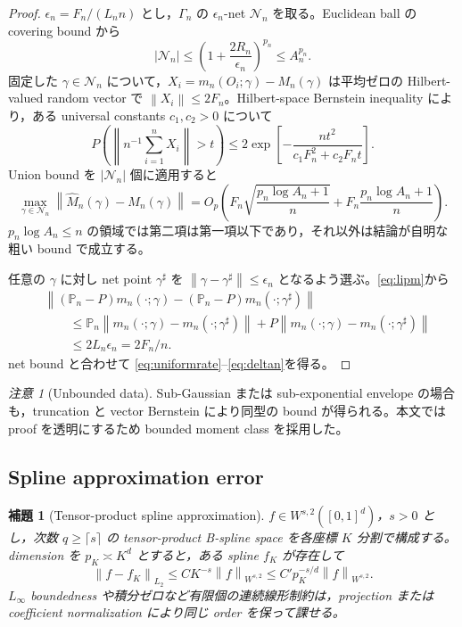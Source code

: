 \documentclass[11pt,a4paper]{ltjsarticle}
\newtheorem{lemma}{補題}[section]
\theoremstyle{remark}
\newtheorem{remark}{注意}[section]
\newcommand{\Pp}{\mathbb P}
\newcommand{\wh}{\widehat}
\newcommand{\norm}[1]{\left\lVert#1\right\rVert}
\newcommand{\cN}{\mathcal N}
\begin{document}
\begin{proof}
$\epsilon_n=F_n/(L_nn)$ とし，$\Gamma_n$ の $\epsilon_n$-net $\cN_n$ を取る。Euclidean ball の covering bound から
\[
|\cN_n|
\le\left(1+\frac{2R_n}{\epsilon_n}\right)^{p_n}
\le A_n^{p_n}.
\]
固定した $\gamma\in\cN_n$ について，$X_i=m_n(O_i;\gamma)-M_n(\gamma)$ は平均ゼロの Hilbert-valued random vector で $\norm{X_i}\le2F_n$。Hilbert-space Bernstein inequality により，ある universal constants $c_1,c_2>0$ について
\[
P\left(
\norm{n^{-1}\sum_{i=1}^nX_i}>t
\right)
\le2\exp\left[-\frac{nt^2}{c_1F_n^2+c_2F_nt}\right].
\]
Union bound を $|\cN_n|$ 個に適用すると
\[
\max_{\gamma\in\cN_n}
\norm{\wh M_n(\gamma)-M_n(\gamma)}
=O_p\left(
F_n\sqrt{\frac{p_n\log A_n+1}{n}}
+F_n\frac{p_n\log A_n+1}{n}
\right).
\]
$p_n\log A_n\le n$ の領域では第二項は第一項以下であり，それ以外は結論が自明な粗い bound で成立する。

任意の $\gamma$ に対し net point $\gamma^\sharp$ を $\norm{\gamma-\gamma^\sharp}\le\epsilon_n$ となるよう選ぶ。\eqref{eq:lipm}から
\begin{align*}
&\norm{(\Pp_n-P)m_n(\cdot;\gamma)
-(\Pp_n-P)m_n(\cdot;\gamma^\sharp)}\\
&\qquad\le
\Pp_n\norm{m_n(\cdot;\gamma)-m_n(\cdot;\gamma^\sharp)}
+P\norm{m_n(\cdot;\gamma)-m_n(\cdot;\gamma^\sharp)}\\
&\qquad\le2L_n\epsilon_n=2F_n/n.
\end{align*}
net bound と合わせて \eqref{eq:uniformrate}--\eqref{eq:deltan}を得る。
\end{proof}

\begin{remark}[Unbounded data]
Sub-Gaussian または sub-exponential envelope の場合も，truncation と vector Bernstein により同型の bound が得られる。本文では proof を透明にするため bounded moment class を採用した。
\end{remark}

\subsection{Spline approximation error}
\begin{lemma}[Tensor-product spline approximation]\label{lem:splineapprox}
$f\in W^{s,2}([0,1]^d)$，$s>0$ とし，次数 $q\ge\lceil s\rceil$ の tensor-product B-spline space を各座標 $K$ 分割で構成する。dimension を $p_K\asymp K^d$ とすると，ある spline $f_K$ が存在して
\begin{equation}
\norm{f-f_K}_{L_2}
\le C K^{-s}\norm f_{W^{s,2}}
\le C' p_K^{-s/d}\norm f_{W^{s,2}}.
\label{eq:splineapprox}
\end{equation}
$L_\infty$ boundedness や積分ゼロなど有限個の連続線形制約は，projection または coefficient normalization により同じ order を保って課せる。
\end{lemma}
\end{document}
